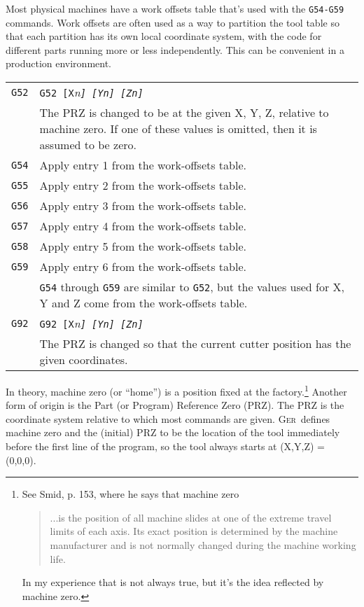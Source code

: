 \documentclass[titlepage,oneside,10pt]{article}
\newcommand{\ger}{\textsc{Ger}}
\begin{document}
Most physical machines have a work offsets table that's used with the
{\tt G54-G59} commands. Work offsets are often used as a way to
partition the tool table so that each partition has its own local
coordinate system, with the code for different parts running more or
less independently. This can be convenient in a production environment.


\vskip 0.25cm
\begin{longtable}{lp{10cm}}
{\tt G52}& {\tt G52 [X}\em{n}\tt{]} \tt{[Y}\em{n}\tt{]} \tt{[Z}\em{n}\tt{]} \\
& The PRZ is changed to be at the given X, Y, Z, relative to machine
zero. If one of these values is omitted, then it is assumed to be zero.\\
{\tt G54}& Apply entry 1 from the work-offsets table.\\
{\tt G55}& Apply entry 2 from the work-offsets table.\\
{\tt G56}& Apply entry 3 from the work-offsets table.\\
{\tt G57}& Apply entry 4 from the work-offsets table.\\
{\tt G58}& Apply entry 5 from the work-offsets table.\\
{\tt G59}& Apply entry 6 from the work-offsets table.\\
& {\tt G54} through {\tt G59} are similar to {\tt G52},
but the values used for X, Y and Z come from the work-offsets table.\\
{\tt G92}& {\tt G92 [X}\em{n}\tt{]} \tt{[Y}\em{n}\tt{]} \tt{[Z}\em{n}\tt{]} \\
&The PRZ is changed so that the current cutter position has the given
coordinates.
\end{longtable}

In theory, machine zero (or ``home'') is a position fixed at the
factory.\footnote{See Smid, p. 153, where he says that machine zero
\begin{quote}
  ...is the position of all machine slides at one of the extreme
  travel limits of each axis. Its exact position is determined by the
  machine manufacturer and is not normally changed during the machine
  working life.
  \end{quote}
In my experience that is not always true, but it's the idea
reflected by machine zero.}
Another form of origin is the Part (or Program) Reference Zero
(PRZ). The PRZ is the coordinate system relative to which most
commands are given. \ger\ defines machine zero and the (initial) PRZ
to be the location of the tool immediately before the first line of
the program, so the tool always starts at (X,Y,Z) = (0,0,0). 
\end{document}
